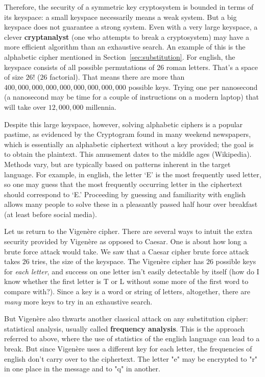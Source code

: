 \documentclass{article}
\theoremstyle{plain}
\theoremstyle{definition}
\theoremstyle{remark}
\numberwithin{theorem}{section}
\newcommand{\bespokedemo}[1]{\href{bespoke:#1}{\textsf{[\,interactive: #1\,]}}}
\newif\ifweb \webfalse
\DeclareRobustCommand{\webonly}[1]{\ifweb#1\fi}
\begin{document}
\webonly{\bespokedemo{caesar-crack-tool}}

Therefore, the security of a symmetric key cryptosystem is bounded in terms of its keyspace:  a small keyspace necessarily means a weak system.  But a big keyspace does not guarantee a strong system.  Even with a very large keyspace, a clever \textbf{cryptanalyst} (one who attempts to break a cryptosystem) may have a more efficient algorithm than an exhaustive search.  An example of this is the alphabetic cipher mentioned in Section~\ref{sec:substitution}.  For english, the keyspace consists of all possible permutations of 26 roman letters.  That's a space of size $26!$ ($26$ factorial).  That means there are more than $400,000,000,000,000,000,000,000,000$ possible keys.  Trying one per nanosecond (a nanosecond may be time for a couple of instructions on a modern laptop) that will take over $12,000,000$ millennia.

Despite this large keyspace, however, solving alphabetic ciphers is a popular pastime, as evidenced by the Cryptogram found in many weekend newspapers, which is essentially an alphabetic ciphertext without a key provided; the goal is to obtain the plaintext.  This amusement dates to the middle ages (Wikipedia).  Methods vary, but are typically based on patterns inherent in the target language.  For example, in english, the letter `E' is the most frequently used letter, so one may guess that the most frequently occurring letter in the ciphertext should correspond to `E.'  Proceeding by guessing and familiarity with english allows many people to solve these in a pleasantly passed half hour over breakfast (at least before social media).

\webonly{\bespokedemo{cryptogram-tool}}

Let us return to the Vigen\`ere cipher.  There are several ways to intuit the extra security provided by Vigen\`ere as opposed to Caesar.  One is about how long a brute force attack would take.  We saw that a Caesar cipher brute force attack takes $26$ tries, the size of the keyspace.  The Vigen\`{e}re cipher has 26 possible keys for \emph{each letter}, and success on one letter isn't easily detectable by itself (how do I know whether the first letter is T or L without some more of the first word to compare with?).  Since a key is a word or string of letters, altogether, there are \emph{many} more keys to try in an exhaustive search.

But Vigen\`ere also thwarts another classical attack on any substitution cipher:  statistical analysis, usually called \textbf{frequency analysis}.  This is the approach referred to above, where the use of statistics of the english language can lead to a break.  But since Vigen\`ere uses a different key for each letter, the frequencies of english don't carry over to the ciphertext.  The letter "e" may be encrypted to "r" in one place in the message and to "q" in another.
\end{document}
